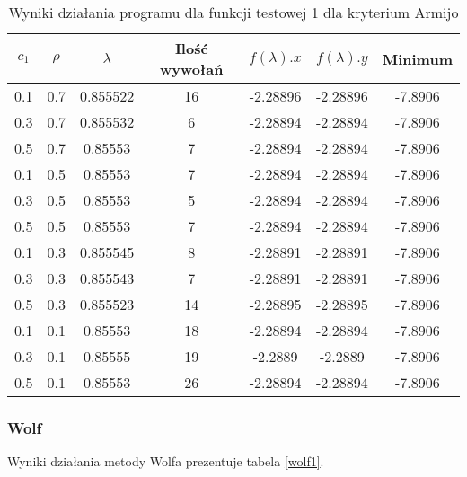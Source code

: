 \documentclass{classrep}
\begin{document}
\begin{table}
  \centering
  \caption{Wyniki działania programu dla funkcji testowej 1 dla kryterium Armijo}
  \label{armijo1}
  \begin{tabular}{|c|c|c|c|c|c|c|}
    \hline
    $c_1$ & $\rho$ & $\lambda$ & Ilość wywołań & $f(\lambda).x$ & $f(\lambda).y$ & Minimum \\
    \hline
    0.1 & 0.7 & 0.855522 & 16 & -2.28896 & -2.28896 & -7.8906 \\
    0.3 & 0.7 & 0.855532 & 6 & -2.28894 & -2.28894 & -7.8906 \\
    0.5 & 0.7 & 0.85553 & 7 & -2.28894 & -2.28894 & -7.8906 \\
    0.1 & 0.5 & 0.85553 & 7 & -2.28894 & -2.28894 & -7.8906 \\
    0.3 & 0.5 & 0.85553 & 5 & -2.28894 & -2.28894 & -7.8906 \\
    0.5 & 0.5 & 0.85553 & 7 & -2.28894 & -2.28894 & -7.8906 \\
    0.1 & 0.3 & 0.855545 & 8 & -2.28891 & -2.28891 & -7.8906 \\
    0.3 & 0.3 & 0.855543 & 7 & -2.28891 & -2.28891 & -7.8906 \\
    0.5 & 0.3 & 0.855523 & 14 & -2.28895 & -2.28895 & -7.8906 \\
    0.1 & 0.1 & 0.85553 & 18 & -2.28894 & -2.28894 & -7.8906 \\
    0.3 & 0.1 & 0.85555 & 19 & -2.2889 & -2.2889 & -7.8906 \\
    0.5 & 0.1 & 0.85553 & 26 & -2.28894 & -2.28894 & -7.8906 \\
    \hline
  \end{tabular}
\end{table}

\subsubsection{Wolf}

Wyniki działania metody Wolfa prezentuje tabela \ref{wolf1}.
\end{document}
